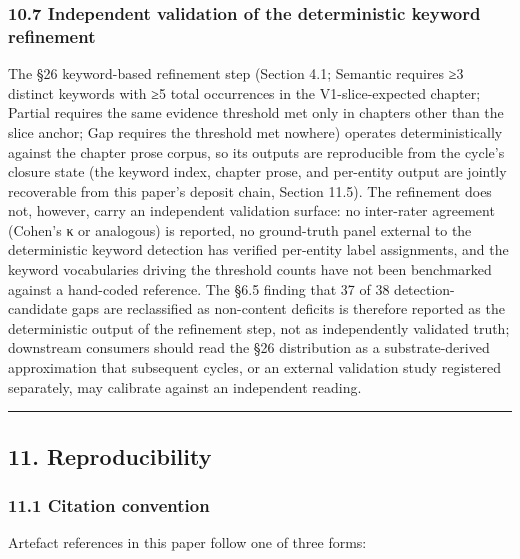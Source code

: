 \documentclass[
]{article}
\begin{document}
\subsubsection{10.7 Independent validation of the deterministic keyword
refinement}\label{independent-validation-of-the-deterministic-keyword-refinement}

The §26 keyword-based refinement step (Section 4.1; Semantic requires ≥3
distinct keywords with ≥5 total occurrences in the V1-slice-expected
chapter; Partial requires the same evidence threshold met only in
chapters other than the slice anchor; Gap requires the threshold met
nowhere) operates deterministically against the chapter prose corpus, so
its outputs are reproducible from the cycle's closure state (the keyword
index, chapter prose, and per-entity output are jointly recoverable from
this paper's deposit chain, Section 11.5). The refinement does not,
however, carry an independent validation surface: no inter-rater
agreement (Cohen's κ or analogous) is reported, no ground-truth panel
external to the deterministic keyword detection has verified per-entity
label assignments, and the keyword vocabularies driving the threshold
counts have not been benchmarked against a hand-coded reference. The
§6.5 finding that 37 of 38 detection-candidate gaps are reclassified as
non-content deficits is therefore reported as the deterministic output
of the refinement step, not as independently validated truth; downstream
consumers should read the §26 distribution as a substrate-derived
approximation that subsequent cycles, or an external validation study
registered separately, may calibrate against an independent reading.

\begin{center}\rule{0.5\linewidth}{0.5pt}\end{center}

\subsection{11. Reproducibility}\label{reproducibility}

\subsubsection{11.1 Citation convention}\label{citation-convention}

Artefact references in this paper follow one of three forms:
\end{document}
